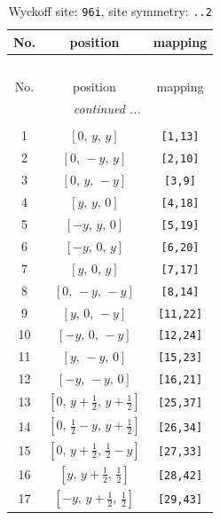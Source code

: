 \documentclass[fleqn,8pt]{jsarticle}
\begin{document}
\begin{longtable}{ccc}
\caption{Wyckoff site: {\tt 96i}, site symmetry: {\tt ..2}}
 \\
 \hline \hline
No. & position & mapping \\ \hline \endfirsthead

\multicolumn{2}{l}{\tablename\ \thetable{}} \\
 \hline \hline
No. & position & mapping \\ \hline \endhead

 \hline \hline
\multicolumn{2}{r}{\footnotesize\it continued ...} \\ \endfoot

 \hline \hline
\multicolumn{2}{r}{} \\ \endlastfoot

1 & $\left[ 0,\, y,\, y \right]$ & {\tt [1,13]} \\ \hline
2 & $\left[ 0,\, - y,\, y \right]$ & {\tt [2,10]} \\ \hline
3 & $\left[ 0,\, y,\, - y \right]$ & {\tt [3,9]} \\ \hline
4 & $\left[ y,\, y,\, 0 \right]$ & {\tt [4,18]} \\ \hline
5 & $\left[ - y,\, y,\, 0 \right]$ & {\tt [5,19]} \\ \hline
6 & $\left[ - y,\, 0,\, y \right]$ & {\tt [6,20]} \\ \hline
7 & $\left[ y,\, 0,\, y \right]$ & {\tt [7,17]} \\ \hline
8 & $\left[ 0,\, - y,\, - y \right]$ & {\tt [8,14]} \\ \hline
9 & $\left[ y,\, 0,\, - y \right]$ & {\tt [11,22]} \\ \hline
10 & $\left[ - y,\, 0,\, - y \right]$ & {\tt [12,24]} \\ \hline
11 & $\left[ y,\, - y,\, 0 \right]$ & {\tt [15,23]} \\ \hline
12 & $\left[ - y,\, - y,\, 0 \right]$ & {\tt [16,21]} \\ \hline
13 & $\left[ 0,\, y + \frac{1}{2},\, y + \frac{1}{2} \right]$ & {\tt [25,37]} \\ \hline
14 & $\left[ 0,\, \frac{1}{2} - y,\, y + \frac{1}{2} \right]$ & {\tt [26,34]} \\ \hline
15 & $\left[ 0,\, y + \frac{1}{2},\, \frac{1}{2} - y \right]$ & {\tt [27,33]} \\ \hline
16 & $\left[ y,\, y + \frac{1}{2},\, \frac{1}{2} \right]$ & {\tt [28,42]} \\ \hline
17 & $\left[ - y,\, y + \frac{1}{2},\, \frac{1}{2} \right]$ & {\tt [29,43]} \\ \hline

\end{longtable}
\end{document}
